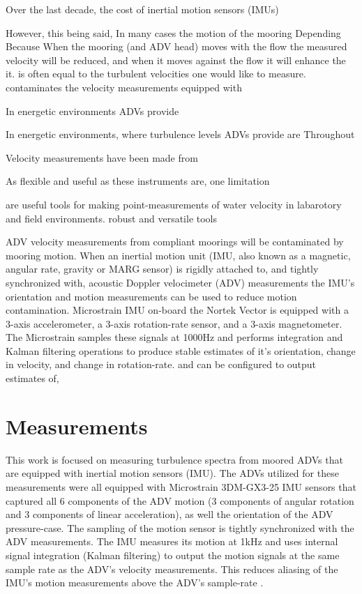 \documentclass[twocol]{ametsoc}
\begin{document}
Over the last decade, the cost of inertial motion sensors (IMUs)

However, this being said,  In many cases the motion of the mooring Depending Because When the mooring (and ADV head) moves with the flow the measured velocity will be reduced, and when it moves against the flow it will enhance the it. is often equal to the turbulent velocities one would like to measure. contaminates the velocity measurements  equipped with 

In energetic environments ADVs provide 

In energetic environments, where turbulence levels ADVs provide are Throughout 

Velocity measurements have been made from 

As flexible and useful as these instruments are, one limitation 

are useful tools for making point-measurements of water velocity in labarotory and field environments. 
robust and versatile tools 

  ADV velocity measurements from compliant moorings will be contaminated by mooring motion. When an inertial motion unit (IMU, also known as a magnetic, angular rate, gravity or MARG sensor) is rigidly attached to, and tightly synchronized with, acoustic Doppler velocimeter (ADV) measurements the IMU's orientation and motion measurements can be used to reduce motion contamination.  Microstrain IMU on-board the Nortek Vector is equipped with a 3-axis accelerometer, a 3-axis rotation-rate sensor, and a 3-axis magnetometer.  The Microstrain samples these signals at 1000Hz and performs integration and Kalman filtering operations to produce stable estimates of it's orientation, change in velocity, and change in rotation-rate.  and  can be configured to output estimates of,

\section{Measurements}
\label{sec:meas}

This work is focused on measuring turbulence spectra from moored ADVs that are equipped with inertial motion sensors (IMU). The ADVs utilized for these measurements were all equipped with Microstrain 3DM-GX3-25 IMU sensors that captured all 6 components of the ADV motion (3 components of angular rotation and 3 components of linear acceleration), as well the orientation of the ADV pressure-case. The sampling of the motion sensor is tightly synchronized with the ADV measurements. The IMU measures its motion at 1kHz and uses internal signal integration (Kalman filtering) to output the motion signals at the same sample rate as the ADV's velocity measurements. This reduces aliasing of the IMU's motion measurements above the ADV's sample-rate \cite{3DM-GX3_coning_sculling}.
\end{document}

